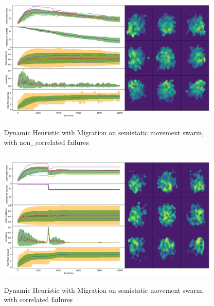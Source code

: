 \documentclass{UoYCSproject}
\begin{document}
\begin{figure}[htb]
\label{fig:static_movement_non3}
\begin{center}
\centering
\includegraphics[height=7cm]{"./Dynamic_Migration/Static_Move_non.png"}
\caption{Dynamic Heuristic with Migration on semi\-static movement swarm, with non\_correlated failures}
\end{center}
\end{figure}

\begin{figure}[htb]
\label{fig:static_movement_con3}
\begin{center}
\centering
\includegraphics[height=7cm]{"./Dynamic_Migration/Static_Move_con.png"}
\caption{Dynamic Heuristic with Migration on semi\-static movement swarm, with correlated failures}
\end{center}
\end{figure}
\end{document}
